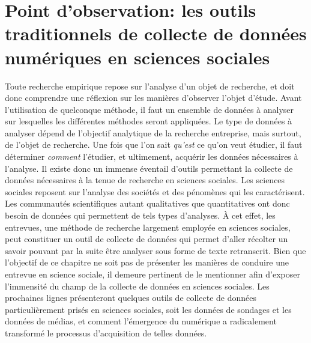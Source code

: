 \documentclass[
  letterpaper,
  DIV=11,
  numbers=noendperiod]{scrreprt}
\begin{document}
\hypertarget{point-dobservation-les-outils-traditionnels-de-collecte-de-donnuxe9es-numuxe9riques-en-sciences-sociales}{%
\section{\texorpdfstring{\textbf{Point d'observation: les outils
traditionnels de collecte de données numériques en sciences
sociales}}{Point d'observation: les outils traditionnels de collecte de données numériques en sciences sociales}}\label{point-dobservation-les-outils-traditionnels-de-collecte-de-donnuxe9es-numuxe9riques-en-sciences-sociales}}

Toute recherche empirique repose sur l'analyse d'un objet de recherche,
et doit donc comprendre une réflexion sur les manières d'observer
l'objet d'étude. Avant l'utilisation de quelconque méthode, il faut un
ensemble de données à analyser sur lesquelles les différentes méthodes
seront appliquées. Le type de données à analyser dépend de l'objectif
analytique de la recherche entreprise, mais surtout, de l'objet de
recherche. Une fois que l'on sait \emph{qu'est} ce qu'on veut étudier,
il faut déterminer \emph{comment} l'étudier, et ultimement, acquérir les
données nécessaires à l'analyse. Il existe donc un immense éventail
d'outils permettant la collecte de données nécessaires à la tenue de
recherche en sciences sociales. Les sciences sociales reposent sur
l'analyse des sociétés et des pénomènes qui les caractérisent. Les
communautés scientifiques autant qualitatives que quantitatives ont donc
besoin de données qui permettent de tels types d'analyses. À cet effet,
les entrevues, une méthode de recherche largement employée en sciences
sociales, peut constituer un outil de collecte de données qui permet
d'aller récolter un savoir pouvant par la suite être analyser sous forme
de texte retranscrit. Bien que l'objectif de ce chapitre ne soit pas de
présenter les manières de conduire une entrevue en science sociale, il
demeure pertinent de le mentionner afin d'exposer l'immensité du champ
de la collecte de données en sciences sociales. Les prochaines lignes
présenteront quelques outils de collecte de données particulièrement
prisés en sciences sociales, soit les données de sondages et les données
de médias, et comment l'émergence du numérique a radicalement transformé
le processus d'acquisition de telles données.
\end{document}

